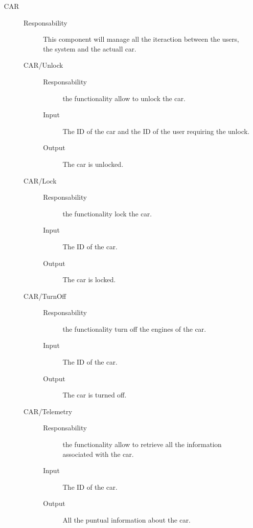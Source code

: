\documentclass[11pt]{article} %
\begin{document}
\begin{description}
	\item[CAR] \hfill
	\begin{description}
		\item[Responsability] This component will manage all the iteraction between the users, the system and the actuall car.
	\item[CAR/Unlock] \hfill
		\begin{description}
			\item[Responsability] the functionality allow to unlock the car.
			\item[Input] The ID of the car and the ID of the user requiring the unlock.
			\item[Output] The car is unlocked.
		\end{description}
	\item[CAR/Lock] \hfill
		\begin{description}
			\item[Responsability] the functionality lock the car.
			\item[Input] The ID of the car.
			\item[Output] The car is locked.
		\end{description}
	\item[CAR/TurnOff] \hfill
		\begin{description}
			\item[Responsability] the functionality turn off the engines of the car.
			\item[Input] The ID of the car.
			\item[Output] The car is turned off.
		\end{description}
	\item[CAR/Telemetry] \hfill
		\begin{description}
			\item[Responsability] the functionality allow to retrieve all the information associated with the car.
			\item[Input] The ID of the car.
			\item[Output] All the puntual information about the car.
		\end{description}
	\end{description}


\end{description}
\end{document}
